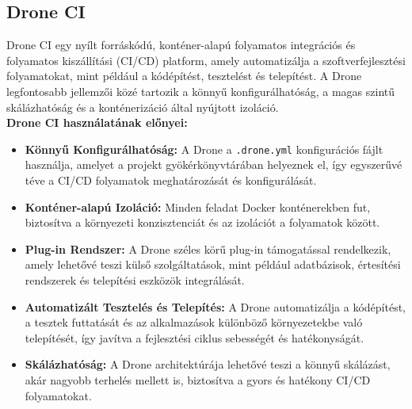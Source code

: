 \subsection{Drone CI}
Drone CI egy nyílt forráskódú, konténer-alapú folyamatos integrációs és folyamatos kiszállítási (CI/CD) platform, amely automatizálja a szoftverfejlesztési folyamatokat, mint például a kódépítést, tesztelést és telepítést. A Drone legfontosabb jellemzői közé tartozik a könnyű konfigurálhatóság, a magas szintű skálázhatóság és a konténerizáció által nyújtott izoláció.
\\
\textbf{Drone CI használatának előnyei:}
\begin{itemize}
  \item \textbf{Könnyű Konfigurálhatóság:} A Drone a \texttt{.drone.yml} konfigurációs fájlt használja, amelyet a projekt gyökérkönyvtárában helyeznek el, így egyszerűvé téve a CI/CD folyamatok meghatározását és konfigurálását.
  \item \textbf{Konténer-alapú Izoláció:} Minden feladat Docker konténerekben fut, biztosítva a környezeti konzisztenciát és az izolációt a folyamatok között.
  \item \textbf{Plug-in Rendszer:} A Drone széles körű plug-in támogatással rendelkezik, amely lehetővé teszi külső szolgáltatások, mint például adatbázisok, értesítési rendszerek és telepítési eszközök integrálását.
  \item \textbf{Automatizált Tesztelés és Telepítés:} A Drone automatizálja a kódépítést, a tesztek futtatását és az alkalmazások különböző környezetekbe való telepítését, így javítva a fejlesztési ciklus sebességét és hatékonyságát.
  \item \textbf{Skálázhatóság:} A Drone architektúrája lehetővé teszi a könnyű skálázást, akár nagyobb terhelés mellett is, biztosítva a gyors és hatékony CI/CD folyamatokat.
\end{itemize}